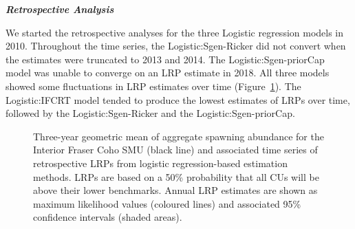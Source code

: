 \documentclass[11pt]{book}
\begin{document}
\textbf{\emph{Retrospective Analysis}}

We started the retrospective analyses for the three Logistic regression models in 2010. Throughout the time series, the Logistic:Sgen-Ricker did not convert when the estimates were truncated to 2013 and 2014. The Logistic:Sgen-priorCap model was unable to converge on an LRP estimate in 2018. All three models showed some fluctuations in LRP estimates over time (Figure~\ref{fig:coho-retroLRPs}). The Logistic:IFCRT model tended to produce the lowest estimates of LRPs over time, followed by the Logistic:Sgen-Ricker and the Logistic:Sgen-priorCap.
\begin{figure}[htb]

{\centering {} 

}

\caption{Three-year geometric mean of aggregate spawning abundance for the Interior Fraser Coho SMU (black line) and associated time series of retrospective LRPs from logistic regression-based estimation methods. LRPs are based on a 50\% probability that all CUs will be above their lower benchmarks. Annual LRP estimates are shown as maximum likelihood values (coloured lines) and associated 95\% confidence intervals (shaded areas).}\label{fig:coho-retroLRPs}
\end{figure}
\linebreak
\end{document}
